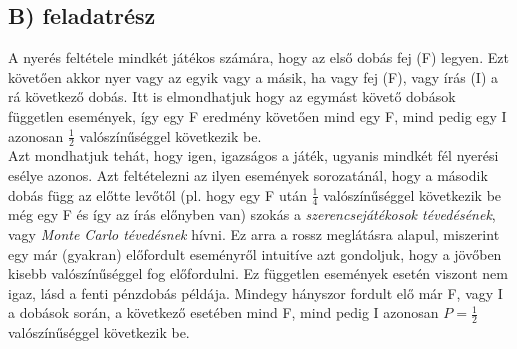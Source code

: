 \subsection*{B) feladatrész}
A nyerés feltétele mindkét játékos számára, hogy az első dobás fej (F) legyen. Ezt követően akkor nyer vagy az egyik vagy a másik, ha vagy fej (F), vagy írás (I) a rá következő dobás. Itt is elmondhatjuk hogy az egymást követő dobások független események, így egy F eredmény követően mind egy F, mind pedig egy I azonosan $\frac{1}{2}$ valószínűséggel következik be. \\
Azt mondhatjuk tehát, hogy igen, igazságos a játék, ugyanis mindkét fél nyerési esélye azonos. Azt feltételezni az ilyen események sorozatánál, hogy a második dobás függ az előtte levőtől (pl. hogy egy F után $\frac{1}{4}$ valószínűséggel következik be még egy F és így az írás előnyben van) szokás a \emph{szerencsejátékosok tévedésének}\cite{croson2005gambler}, vagy \emph{Monte Carlo tévedésnek} hívni. Ez arra a rossz meglátásra alapul, miszerint egy már (gyakran) előfordult eseményről intuitíve azt gondoljuk, hogy a jövőben kisebb valószínűséggel fog előfordulni. Ez független események esetén viszont nem igaz, lásd a fenti pénzdobás példája. Mindegy hányszor fordult elő már F, vagy I a dobások során, a következő esetében mind F, mind pedig I azonosan $P = \frac{1}{2}$ valószínűséggel következik be.